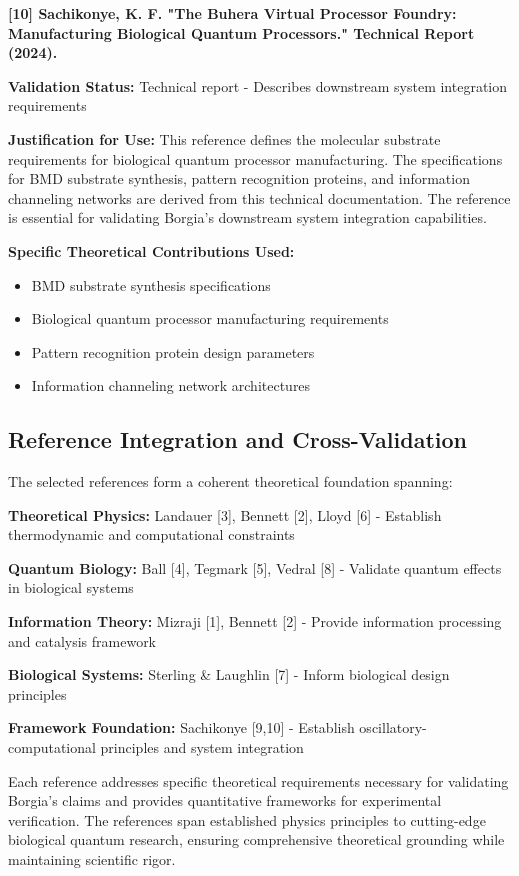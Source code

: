 \textbf{[10] Sachikonye, K. F. "The Buhera Virtual Processor Foundry: Manufacturing Biological Quantum Processors." Technical Report (2024).}

\textbf{Validation Status:} Technical report - Describes downstream system integration requirements

\textbf{Justification for Use:} This reference defines the molecular substrate requirements for biological quantum processor manufacturing. The specifications for BMD substrate synthesis, pattern recognition proteins, and information channeling networks are derived from this technical documentation. The reference is essential for validating Borgia's downstream system integration capabilities.

\textbf{Specific Theoretical Contributions Used:}
\begin{itemize}
\item BMD substrate synthesis specifications
\item Biological quantum processor manufacturing requirements
\item Pattern recognition protein design parameters
\item Information channeling network architectures
\end{itemize}

\subsection{Reference Integration and Cross-Validation}

The selected references form a coherent theoretical foundation spanning:

\textbf{Theoretical Physics:} Landauer [3], Bennett [2], Lloyd [6] - Establish thermodynamic and computational constraints

\textbf{Quantum Biology:} Ball [4], Tegmark [5], Vedral [8] - Validate quantum effects in biological systems

\textbf{Information Theory:} Mizraji [1], Bennett [2] - Provide information processing and catalysis framework

\textbf{Biological Systems:} Sterling \& Laughlin [7] - Inform biological design principles

\textbf{Framework Foundation:} Sachikonye [9,10] - Establish oscillatory-computational principles and system integration

Each reference addresses specific theoretical requirements necessary for validating Borgia's claims and provides quantitative frameworks for experimental verification. The references span established physics principles to cutting-edge biological quantum research, ensuring comprehensive theoretical grounding while maintaining scientific rigor.

